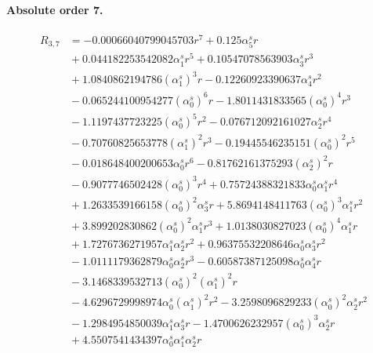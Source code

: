 \documentclass[10pt]{article}
\begin{document}
\paragraph{Absolute order 7.}
\begin{align*}
R_{3,7} &=  - 0.00066040799045703 r^{7} + 0.125 \alpha_{5}^s r \\
&{}  + 0.044182253542082 \alpha_{1}^s r^{5} + 0.10547078563903 \alpha_{3}^s r^{3} \\
&{}  + 1.0840862194786 \left(\alpha_{1}^s\right)^{3} r - 0.12260923390637 \alpha_{4}^s r^{2} \\
&{}  - 0.065244100954277 \left(\alpha_{0}^s\right)^{6} r - 1.8011431833565 \left(\alpha_{0}^s\right)^{4} r^{3} \\
&{}  - 1.1197437723225 \left(\alpha_{0}^s\right)^{5} r^{2} - 0.076712092161027 \alpha_{2}^s r^{4} \\
&{}  - 0.70760825653778 \left(\alpha_{1}^s\right)^{2} r^{3} - 0.19445546235151 \left(\alpha_{0}^s\right)^{2} r^{5} \\
&{}  - 0.018648400200653 \alpha_{0}^s r^{6} - 0.81762161375293 \left(\alpha_{2}^s\right)^{2} r \\
&{}  - 0.9077746502428 \left(\alpha_{0}^s\right)^{3} r^{4} + 0.75724388321833 \alpha_{0}^s \alpha_{1}^s r^{4} \\
&{}  + 1.2633539166158 \left(\alpha_{0}^s\right)^{2} \alpha_{3}^s r + 5.8694148411763 \left(\alpha_{0}^s\right)^{3} \alpha_{1}^s r^{2} \\
&{}  + 3.899202830862 \left(\alpha_{0}^s\right)^{2} \alpha_{1}^s r^{3} + 1.0138030827023 \left(\alpha_{0}^s\right)^{4} \alpha_{1}^s r \\
&{}  + 1.7276736271957 \alpha_{1}^s \alpha_{2}^s r^{2} + 0.96375532208646 \alpha_{0}^s \alpha_{3}^s r^{2} \\
&{}  - 1.0111179362879 \alpha_{0}^s \alpha_{2}^s r^{3} - 0.60587387125098 \alpha_{0}^s \alpha_{4}^s r \\
&{}  - 3.1468339532713 \left(\alpha_{0}^s\right)^{2} \left(\alpha_{1}^s\right)^{2} r \\
&{}  - 4.6296729998974 \alpha_{0}^s \left(\alpha_{1}^s\right)^{2} r^{2} - 3.2598096829233 \left(\alpha_{0}^s\right)^{2} \alpha_{2}^s r^{2} \\
&{}  - 1.2984954850039 \alpha_{1}^s \alpha_{3}^s r - 1.4700626232957 \left(\alpha_{0}^s\right)^{3} \alpha_{2}^s r \\
&{}  + 4.5507541434397 \alpha_{0}^s \alpha_{1}^s \alpha_{2}^s r
\end{align*}
\end{document}
